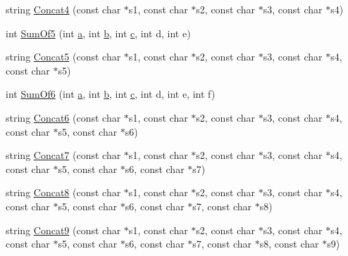 \begin{DoxyCompactItemize}
\item 
string \hyperlink{namespacetesting_1_1gmock__generated__actions__test_a18260e53a4612dc68eaa3b43a13ad57e}{Concat4} (const char $\ast$s1, const char $\ast$s2, const char $\ast$s3, const char $\ast$s4)
\item 
int \hyperlink{namespacetesting_1_1gmock__generated__actions__test_a7ebfbfdf11d92d4f99df6b659c371e74}{Sum\+Of5} (int \hyperlink{_07copy_08_2_read_camera_model_8m_a551a3d351eadcc0b9b1a2f24f0fb5ea0}{a}, int \hyperlink{jquery_8js_a2fa551895933fae935a0a6b87282241d}{b}, int \hyperlink{jquery_8js_abce695e0af988ece0826d9ad59b8160d}{c}, int d, int e)
\item 
string \hyperlink{namespacetesting_1_1gmock__generated__actions__test_ac9d254c06f94974ffb0acd8d0f1f8d88}{Concat5} (const char $\ast$s1, const char $\ast$s2, const char $\ast$s3, const char $\ast$s4, const char $\ast$s5)
\item 
int \hyperlink{namespacetesting_1_1gmock__generated__actions__test_a3f60acee43510c1603549a1f3bab61ad}{Sum\+Of6} (int \hyperlink{_07copy_08_2_read_camera_model_8m_a551a3d351eadcc0b9b1a2f24f0fb5ea0}{a}, int \hyperlink{jquery_8js_a2fa551895933fae935a0a6b87282241d}{b}, int \hyperlink{jquery_8js_abce695e0af988ece0826d9ad59b8160d}{c}, int d, int e, int f)
\item 
string \hyperlink{namespacetesting_1_1gmock__generated__actions__test_a0d9c60ff363796e3edec3587ce7fc856}{Concat6} (const char $\ast$s1, const char $\ast$s2, const char $\ast$s3, const char $\ast$s4, const char $\ast$s5, const char $\ast$s6)
\item 
string \hyperlink{namespacetesting_1_1gmock__generated__actions__test_ac53c9939d35ebbb093b795161fc42504}{Concat7} (const char $\ast$s1, const char $\ast$s2, const char $\ast$s3, const char $\ast$s4, const char $\ast$s5, const char $\ast$s6, const char $\ast$s7)
\item 
string \hyperlink{namespacetesting_1_1gmock__generated__actions__test_aa6540c5cd5e5cb3ca2253739c05323e8}{Concat8} (const char $\ast$s1, const char $\ast$s2, const char $\ast$s3, const char $\ast$s4, const char $\ast$s5, const char $\ast$s6, const char $\ast$s7, const char $\ast$s8)
\item 
string \hyperlink{namespacetesting_1_1gmock__generated__actions__test_a524a8b6e13732969d177254474c94e2b}{Concat9} (const char $\ast$s1, const char $\ast$s2, const char $\ast$s3, const char $\ast$s4, const char $\ast$s5, const char $\ast$s6, const char $\ast$s7, const char $\ast$s8, const char $\ast$s9)
\item 

\end{DoxyCompactItemize}
